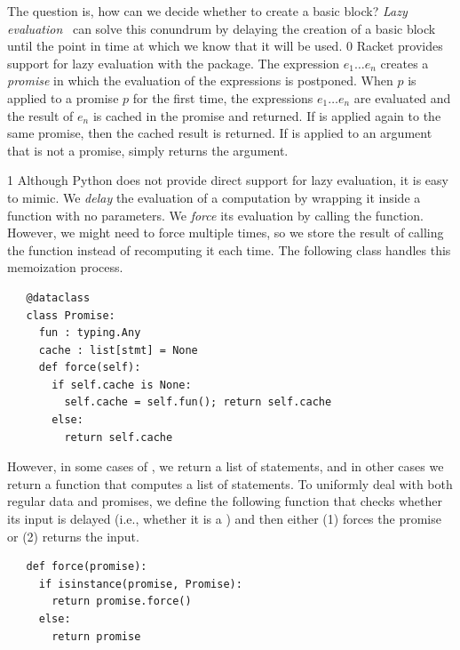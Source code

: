 \documentclass[7x10]{TimesAPriori_MIT}%
\def\racketEd{0}
\def\pythonEd{1}
\def\edition{1}
\newcommand{\pythonColor}[0]{}
\numberwithin{theorem}{chapter}
\numberwithin{definition}{chapter}
\numberwithin{equation}{chapter}
\begin{document}
The question is, how can we decide whether to create a basic block?
\emph{Lazy evaluation}~\citep{Friedman:1976aa} can solve this conundrum by
delaying the creation of a basic block until the point in time at which
we know that it will be used.
%
{\if\edition\racketEd
%
Racket provides support for
lazy evaluation with the
\href{https://docs.racket-lang.org/reference/Delayed_Evaluation.html}{}
package. The expression  $e_1 \ldots e_n$\key{)}
 creates a
\emph{promise} in which the evaluation of the
expressions is postponed. When 
$p$\key{)} is applied to a promise $p$ for the
first time, the expressions $e_1 \ldots e_n$ are evaluated and the
result of $e_n$ is cached in the promise and returned. If 
is applied again to the same promise, then the cached result is
returned.  If  is applied to an argument that is not a
promise,  simply returns the argument.
%
\fi}
%
{\if\edition\pythonEd\pythonColor
%
Although Python does not provide direct support for lazy evaluation,
it is easy to mimic. We \emph{delay} the evaluation of a computation
by wrapping it inside a function with no parameters. We \emph{force}
its evaluation by calling the function. However, we might need to
force multiple times, so we store the result of calling the
function instead of recomputing it each time.  The following
 class handles this memoization process.

\begin{minipage}{0.8\textwidth}
\begin{lstlisting}
   @dataclass
   class Promise:
     fun : typing.Any
     cache : list[stmt] = None
     def force(self):
       if self.cache is None:
         self.cache = self.fun(); return self.cache
       else:
         return self.cache
\end{lstlisting}
\end{minipage}

\noindent However, in some cases of , we return
a list of statements, and in other cases we return a function that
computes a list of statements.  To uniformly deal with both regular
data and promises, we define the following  function that
checks whether its input is delayed (i.e., whether it is a
) and then either (1) forces the promise or (2) returns
the input.
%
\begin{lstlisting}
   def force(promise):
     if isinstance(promise, Promise):
       return promise.force()
     else:
       return promise
\end{lstlisting}
%
\fi}
\end{document}
